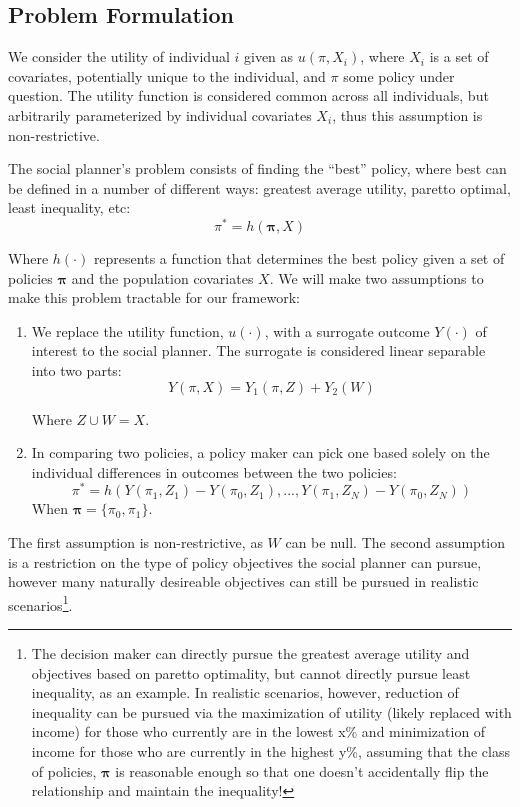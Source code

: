 \documentclass[a4paper,12pt]{article}
\begin{document}


\subsection*{Problem Formulation}

We consider the utility of individual $i$ given as $ u(\pi, X_i)$, where $X_i$ is a set of covariates, potentially unique to the individual, and $\pi$ some policy under question. The utility function is considered common across all individuals, but arbitrarily parameterized by individual covariates $X_i$, thus this assumption is non-restrictive. 

The social planner's problem consists of finding the ``best'' policy, where best can be defined in a number of different ways: greatest average utility, paretto optimal, least inequality, etc:
%
$$
\pi^* = h(\bm{\pi}, X)
$$

Where $h(\cdot)$ represents a function that determines the best policy given a set of policies $\bm{\pi}$ and the population covariates $X$. We will make two assumptions to make this problem tractable for our framework: 

\begin{enumerate}
\item We replace the utility function, $u(\cdot)$, with a surrogate outcome $Y(\cdot)$ of interest to the social planner. The surrogate is considered linear separable into two parts: 
%
$$
Y(\pi, X) = Y_1(\pi, Z) + Y_2(W)
$$

Where $Z \cup W = X$.

\item In comparing two policies, a policy maker can pick one based solely on the individual differences in outcomes between the two policies: 
%
$$
\pi^* = h(Y(\pi_1, Z_1) - Y(\pi_0, Z_1),...,Y(\pi_1, Z_N) - Y(\pi_0, Z_N))
$$
When $\bm{\pi} = \{\pi_0, \pi_1\}$.
\end{enumerate}

The first assumption is non-restrictive, as $W$ can be null. The second assumption is a restriction on the type of policy objectives the social planner can pursue, however many naturally desireable objectives can still be pursued in realistic scenarios\footnote{The decision maker can directly pursue the greatest average utility and objectives based on paretto optimality, but cannot directly pursue least inequality, as an example. In realistic scenarios, however, reduction of inequality can be pursued via the maximization of utility (likely replaced with income) for those who currently are in the lowest x\% and minimization of income for those who are currently in the highest y\%, assuming that the class of policies, $\bm{\pi}$ is reasonable enough so that one doesn't accidentally flip the relationship and maintain the inequality!}. 
\end{document}

